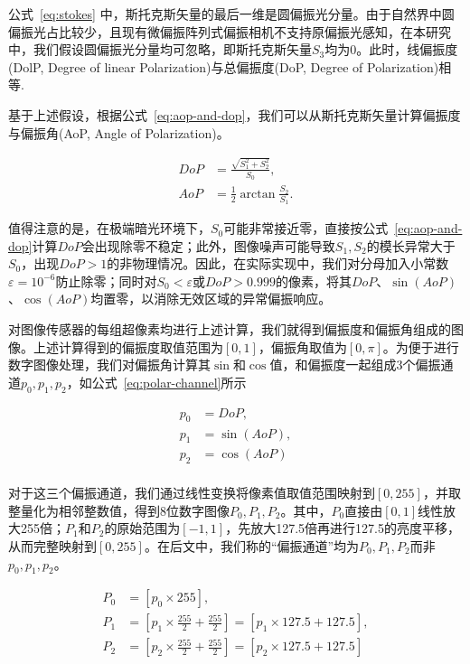 公式~\ref{eq:stokes} 中，斯托克斯矢量的最后一维是圆偏振光分量。由于自然界中圆偏振光占比较少，且现有微偏振阵列式偏振相机不支持原偏振光感知，在本研究中，我们假设圆偏振光分量均可忽略，即斯托克斯矢量$S_3$均为0。此时，线偏振度(DolP, Degree of linear Polarization)与总偏振度(DoP, Degree of Polarization)相等.

基于上述假设，根据公式~\ref{eq:aop-and-dop}，我们可以从斯托克斯矢量计算偏振度与偏振角(AoP, Angle of Polarization)。

\begin{equation}
\label{eq:aop-and-dop}
\begin{aligned}
DoP &= \frac{\sqrt{S_1^2 + S_2^2}}{S_0}, \\
AoP &= \frac{1}{2} \arctan\frac{S_2}{S_1}.
\end{aligned}
\end{equation}


值得注意的是，在极端暗光环境下，$S_0$可能非常接近零，直接按公式~\ref{eq:aop-and-dop}计算$DoP$会出现除零不稳定；此外，图像噪声可能导致$S_1,S_2$的模长异常大于$S_0$，出现$DoP>1$的非物理情况。因此，在实际实现中，我们对分母加入小常数$\varepsilon=10^{-6}$防止除零；同时对$S_0<\varepsilon$或$DoP>0.999$的像素，将其$DoP$、$\sin(AoP)$、$\cos(AoP)$均置零，以消除无效区域的异常偏振响应。

对图像传感器的每组超像素均进行上述计算，我们就得到偏振度和偏振角组成的图像。上述计算得到的偏振度取值范围为$[0,1]$，偏振角取值为$[0, \pi]$。为便于进行数字图像处理，我们对偏振角计算其$\sin$和$\cos$值，和偏振度一起组成3个偏振通道$p_0, p_1, p_2$，如公式~\ref{eq:polar-channel}所示

\begin{equation}
\label{eq:polar-channel}
\begin{aligned}
p_0 & = DoP, \\
p_1 & = \sin(AoP), \\
p_2 & = \cos(AoP) \\
\end{aligned}
\end{equation}

对于这三个偏振通道，我们通过线性变换将像素值取值范围映射到$[0, 255]$，并取整量化为相邻整数值，得到8位数字图像$P_0, P_1, P_2$。其中，$P_0$直接由$[0,1]$线性放大255倍；$P_1$和$P_2$的原始范围为$[-1,1]$，先放大127.5倍再进行127.5的亮度平移，从而完整映射到$[0,255]$。在后文中，我们称的“偏振通道”均为$P_0, P_1, P_2$而非$p_0, p_1, p_2$。

\begin{equation}
\label{eq:polar-channel-2}
\begin{aligned}
P_0 & = \left[p_0 \times 255 \right], \\
P_1 & = \left[p_1 \times \frac{255}{2} + \frac{255}{2}\right] = \left[p_1 \times 127.5 + 127.5\right], \\
P_2 & = \left[p_2 \times \frac{255}{2} + \frac{255}{2}\right] = \left[p_2 \times 127.5 + 127.5\right] \\
\end{aligned}
\end{equation}

